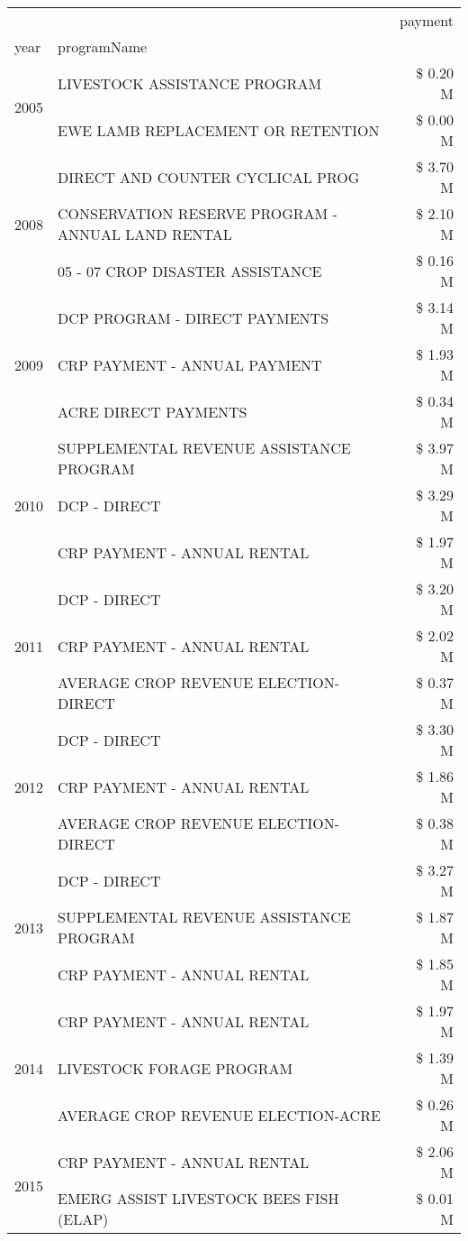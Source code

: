 \begin{tabular}{llr}
\toprule
 &  & payment \\
year & programName &  \\
\midrule
\multirow[t]{2}{*}{2005} & LIVESTOCK ASSISTANCE PROGRAM & \$ 0.20 M \\
 & EWE LAMB REPLACEMENT OR RETENTION & \$ 0.00 M \\
\cline{1-3}
\multirow[t]{3}{*}{2008} & DIRECT AND COUNTER CYCLICAL PROG & \$ 3.70 M \\
 & CONSERVATION RESERVE PROGRAM - ANNUAL LAND RENTAL & \$ 2.10 M \\
 & 05 - 07 CROP DISASTER ASSISTANCE & \$ 0.16 M \\
\cline{1-3}
\multirow[t]{3}{*}{2009} & DCP PROGRAM - DIRECT PAYMENTS & \$ 3.14 M \\
 & CRP PAYMENT - ANNUAL PAYMENT & \$ 1.93 M \\
 & ACRE DIRECT PAYMENTS & \$ 0.34 M \\
\cline{1-3}
\multirow[t]{3}{*}{2010} & SUPPLEMENTAL REVENUE ASSISTANCE PROGRAM & \$ 3.97 M \\
 & DCP - DIRECT & \$ 3.29 M \\
 & CRP PAYMENT - ANNUAL RENTAL & \$ 1.97 M \\
\cline{1-3}
\multirow[t]{3}{*}{2011} & DCP - DIRECT & \$ 3.20 M \\
 & CRP PAYMENT - ANNUAL RENTAL & \$ 2.02 M \\
 & AVERAGE CROP REVENUE ELECTION-DIRECT & \$ 0.37 M \\
\cline{1-3}
\multirow[t]{3}{*}{2012} & DCP - DIRECT & \$ 3.30 M \\
 & CRP PAYMENT - ANNUAL RENTAL & \$ 1.86 M \\
 & AVERAGE CROP REVENUE ELECTION-DIRECT & \$ 0.38 M \\
\cline{1-3}
\multirow[t]{3}{*}{2013} & DCP - DIRECT & \$ 3.27 M \\
 & SUPPLEMENTAL REVENUE ASSISTANCE PROGRAM & \$ 1.87 M \\
 & CRP PAYMENT - ANNUAL RENTAL & \$ 1.85 M \\
\cline{1-3}
\multirow[t]{3}{*}{2014} & CRP PAYMENT - ANNUAL RENTAL & \$ 1.97 M \\
 & LIVESTOCK FORAGE PROGRAM & \$ 1.39 M \\
 & AVERAGE CROP REVENUE ELECTION-ACRE & \$ 0.26 M \\
\cline{1-3}
\multirow[t]{3}{*}{2015} & CRP PAYMENT - ANNUAL RENTAL & \$ 2.06 M \\
 & EMERG ASSIST LIVESTOCK BEES FISH (ELAP) & \$ 0.01 M \\

\end{tabular}
